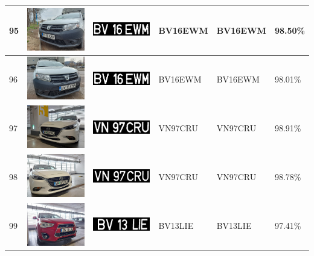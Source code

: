 \documentclass[a4paper,12pt]{report}
\begin{document}
\begin{longtable}{| m{0.6cm} | m{3cm} | m{3cm} | m{1.8cm} | m{1.8cm} | m{1.8cm} |}
        95 & \includegraphics[width=3cm,keepaspectratio]{dataset/56_d1.jpg} & \includegraphics[width=3cm,keepaspectratio]{segmentari/95.jpg} & BV16EWM & BV16EWM & 98.50\% \\ \hline
        96 & \includegraphics[width=3cm,keepaspectratio]{dataset/56_s1.jpg} & \includegraphics[width=3cm,keepaspectratio]{segmentari/96.jpg} & BV16EWM & BV16EWM & 98.01\% \\ \hline
        97 & \includegraphics[width=3cm,keepaspectratio]{dataset/57_d1.jpg} & \includegraphics[width=3cm,keepaspectratio]{segmentari/97.jpg} & VN97CRU & VN97CRU & 98.91\% \\ \hline
        98 & \includegraphics[width=3cm,keepaspectratio]{dataset/57_s1.jpg} & \includegraphics[width=3cm,keepaspectratio]{segmentari/98.jpg} & VN97CRU & VN97CRU & 98.78\% \\ \hline
        99 & \includegraphics[width=3cm,keepaspectratio]{dataset/58_s1.jpg} & \includegraphics[width=3cm,keepaspectratio]{segmentari/99.jpg} & BV13LIE & BV13LIE & 97.41\% \\ \hline

\end{longtable}
\end{document}
